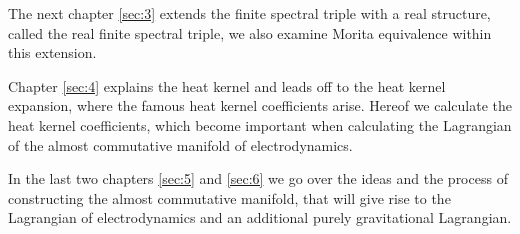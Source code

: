 The next chapter \ref{sec:3} extends the finite spectral triple with a real
structure, called the real finite spectral triple, we also examine Morita
equivalence within this extension.

Chapter \ref{sec:4} explains the heat kernel and leads off to the heat kernel
expansion, where the famous heat kernel coefficients arise. Hereof we
calculate the heat kernel coefficients, which become important when
calculating the Lagrangian of the almost commutative manifold of
electrodynamics.

In the last two chapters \ref{sec:5} and \ref{sec:6} we go over the ideas and
the process of constructing the almost commutative manifold, that will give
rise to the Lagrangian of electrodynamics and an additional purely
gravitational Lagrangian.
